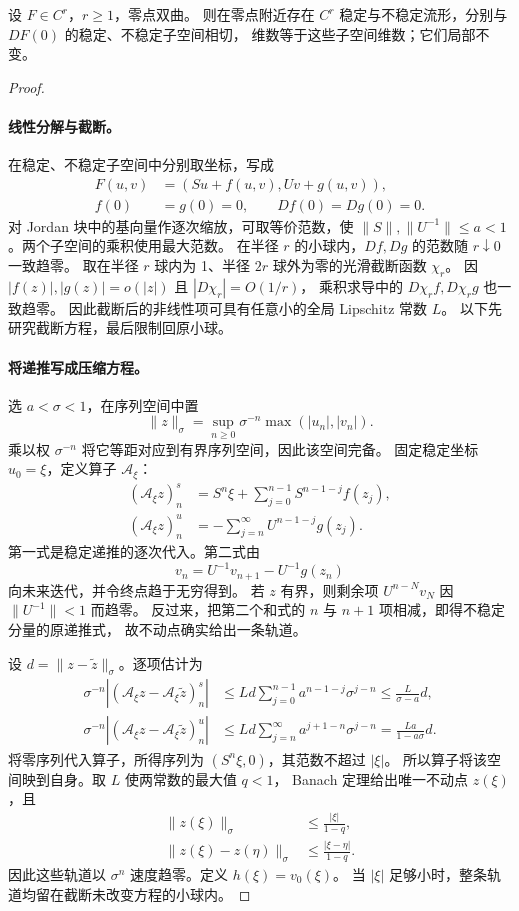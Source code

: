 \begin{theorem}[局部稳定流形]\label{thm:arnold-stable-manifold}
设 $F\in C^r$，$r\geq1$，零点双曲。
则在零点附近存在 $C^r$ 稳定与不稳定流形，分别与 $DF(0)$ 的稳定、不稳定子空间相切，
维数等于这些子空间维数；它们局部不变。
\end{theorem}
\begin{proof}
\paragraph{线性分解与截断。}
在稳定、不稳定子空间中分别取坐标，写成
\[
 \begin{aligned}
 F(u,v)&=(Su+f(u,v),Uv+g(u,v)),\\
 f(0)&=g(0)=0,\qquad Df(0)=Dg(0)=0.
\end{aligned}
\]
对 Jordan 块中的基向量作逐次缩放，可取等价范数，使
$\|S\|,\|U^{-1}\|\leq a<1$。两个子空间的乘积使用最大范数。
在半径 $r$ 的小球内，$Df,Dg$ 的范数随 $r\downarrow0$ 一致趋零。
取在半径 $r$ 球内为 1、半径 $2r$ 球外为零的光滑截断函数 $\chi_r$。
因 $|f(z)|,|g(z)|=o(|z|)$ 且 $|D\chi_r|=O(1/r)$，
乘积求导中的 $D\chi_r f,D\chi_r g$ 也一致趋零。
因此截断后的非线性项可具有任意小的全局 Lipschitz 常数 $L$。
以下先研究截断方程，最后限制回原小球。

\paragraph{将递推写成压缩方程。}
选 $a<\sigma<1$，在序列空间中置
\[
 \|z\|_\sigma=\sup_{n\geq0}\sigma^{-n}\max(|u_n|,|v_n|).
\]
乘以权 $\sigma^{-n}$ 将它等距对应到有界序列空间，因此该空间完备。
固定稳定坐标 $u_0=\xi$，定义算子 $\mathcal A_\xi$：
\begin{align*}
 (\mathcal A_\xi z)^s_n
 &=S^n\xi+\sum_{j=0}^{n-1}S^{n-1-j}f(z_j),\\
 (\mathcal A_\xi z)^u_n
 &=-\sum_{j=n}^\infty U^{n-1-j}g(z_j).
\end{align*}
第一式是稳定递推的逐次代入。第二式由
\[
 v_n=U^{-1}v_{n+1}-U^{-1}g(z_n)
\]
 向未来迭代，并令终点趋于无穷得到。
若 $z$ 有界，则剩余项 $U^{n-N}v_N$ 因 $\|U^{-1}\|<1$ 而趋零。
反过来，把第二个和式的 $n$ 与 $n+1$ 项相减，即得不稳定分量的原递推式，
故不动点确实给出一条轨道。

设 $d=\|z-\widetilde z\|_\sigma$。逐项估计为
\begin{align*}
 \sigma^{-n}|(\mathcal A_\xi z-\mathcal A_\xi\widetilde z)^s_n|
 &\leq Ld\sum_{j=0}^{n-1}a^{n-1-j}\sigma^{j-n}
 \leq\frac{L}{\sigma-a}d,\\
 \sigma^{-n}|(\mathcal A_\xi z-\mathcal A_\xi\widetilde z)^u_n|
 &\leq Ld\sum_{j=n}^\infty a^{j+1-n}\sigma^{j-n}
 =\frac{La}{1-a\sigma}d.
\end{align*}
将零序列代入算子，所得序列为 $(S^n\xi,0)$，其范数不超过 $|\xi|$。
所以算子将该空间映到自身。取 $L$ 使两常数的最大值 $q<1$，
Banach 定理给出唯一不动点 $z(\xi)$，且
\[
 \begin{aligned}
 \|z(\xi)\|_\sigma&\leq\frac{|\xi|}{1-q},\\
 \|z(\xi)-z(\eta)\|_\sigma&\leq\frac{|\xi-\eta|}{1-q}.
\end{aligned}
\]
因此这些轨道以 $\sigma^n$ 速度趋零。定义 $h(\xi)=v_0(\xi)$。
当 $|\xi|$ 足够小时，整条轨道均留在截断未改变方程的小球内。


\end{proof}
